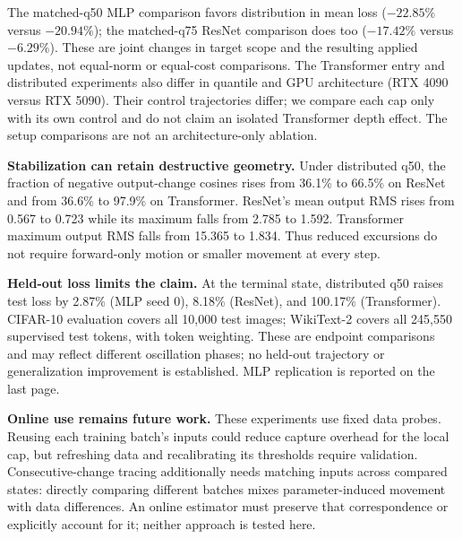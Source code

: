 \documentclass[11pt,a4paper]{article}
\begin{document}
The matched-q50 MLP comparison favors distribution in mean loss
($-22.85\%$ versus $-20.94\%$); the matched-q75 ResNet comparison does too
($-17.42\%$ versus $-6.29\%$). These are joint changes in target scope and the
resulting applied updates, not equal-norm or equal-cost comparisons.
The Transformer entry and distributed experiments also differ in quantile and
GPU architecture (RTX 4090 versus RTX 5090). Their control trajectories differ;
we compare each cap only with its own control and do not claim an isolated
Transformer depth effect. The setup comparisons are not an architecture-only ablation.

\textbf{Stabilization can retain destructive geometry.} Under distributed q50,
the fraction of negative output-change cosines rises from 36.1\% to 66.5\% on
ResNet and from 36.6\% to 97.9\% on Transformer. ResNet's mean output RMS rises
from 0.567 to 0.723 while its maximum falls from 2.785 to 1.592. Transformer
maximum output RMS falls from 15.365 to 1.834. Thus reduced excursions do not
require forward-only motion or smaller movement at every step.

\textbf{Held-out loss limits the claim.} At the terminal state, distributed q50
raises test loss by 2.87\% (MLP seed 0), 8.18\% (ResNet), and 100.17\%
(Transformer). CIFAR-10 evaluation covers all 10,000 test images; WikiText-2
covers all 245,550 supervised test tokens, with token weighting. These are
endpoint comparisons and may reflect different oscillation phases; no held-out
trajectory or generalization improvement is established. MLP replication is
reported on the last page.

\textbf{Online use remains future work.} These experiments use fixed data probes.
Reusing each training batch's inputs could reduce capture overhead for the local
cap, but refreshing data and recalibrating its thresholds require validation.
Consecutive-change tracing additionally needs matching inputs across compared
states: directly comparing different batches mixes parameter-induced movement
with data differences. An online estimator must preserve that correspondence
or explicitly account for it; neither approach is tested here.

\end{document}
